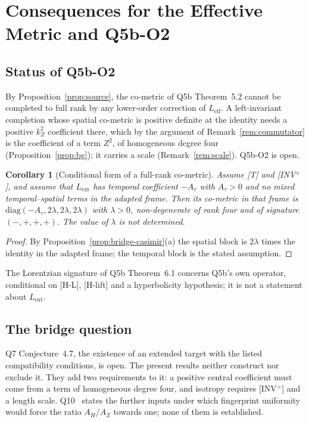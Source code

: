 \documentclass[11pt,a4paper]{article}
\newtheorem{corollary}[theorem]{Corollary}
\theoremstyle{definition}
\theoremstyle{remark}
\newcommand{\Leff}{L_{\mathrm{eff}}}
\newcommand{\Lext}{L_{\mathrm{ext}}}
\newcommand{\Az}{A_{Z}}
\newcommand{\AH}{A_{H}}
\begin{document}
  \section{Consequences for the Effective Metric and Q5b-O2}\label{sec:consequences}

    \subsection{Status of Q5b-O2}

      By Proposition~\ref{prop:source}, the co-metric of Q5b Theorem~5.2 cannot be completed to full rank by any
      lower-order correction of $\Leff$.
      A left-invariant completion whose spatial co-metric is positive definite at the identity needs a positive
      $k_Z^2$ coefficient there, which by the argument of Remark~\ref{rem:commutator} is the coefficient of a
      term $Z^2$, of
      homogeneous degree four (Proposition~\ref{prop:bg}); it carries a scale (Remark~\ref{rem:scale}).
      Q5b-O2 is open.

      \begin{corollary}[Conditional form of a full-rank co-metric]\label{cor:metric}
        Assume \textup{[T]} and \textup{[INV$^+$]}, and assume that $\Lext$ has temporal coefficient $-A_\tau$ with
        $A_\tau > 0$ and no mixed temporal--spatial terms in the adapted frame.
        Then its co-metric in that frame is $\mathrm{diag}(-A_\tau, 2\lambda, 2\lambda, 2\lambda)$ with $\lambda > 0$,
        non-degenerate of rank four and of signature $(-,+,+,+)$.
        The value of $\lambda$ is not determined.
      \end{corollary}

      \begin{proof}
        By Proposition~\ref{prop:bridge-casimir}(a) the spatial block is $2\lambda$ times the identity in the adapted
        frame; the temporal block is the stated assumption.
      \end{proof}

      The Lorentzian signature of Q5b Theorem~6.1 concerns Q5b's own operator, conditional on [H-L], [H-lift] and a
      hyperbolicity hypothesis; it is not a statement about $\Lext$.

    \subsection{The bridge question}

      Q7 Conjecture~4.7, the existence of an extended target with the listed compatibility conditions, is open.
      The present results neither construct nor exclude it.
      They add two requirements to it: a positive central coefficient must come from a term of homogeneous degree
      four, and isotropy requires [INV$^+$] and a length scale.
      Q10~\cite{Beau2026q10} states the further inputs under which fingerprint uniformity would force the ratio
      $\AH/\Az$ towards one; none of them is established.
\end{document}
